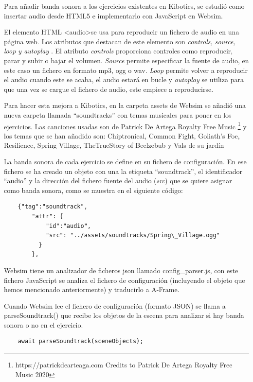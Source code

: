Para añadir banda sonora a los ejercicios existentes en Kibotics, se estudió como insertar audio desde HTML5 e implementarlo con JavaScript en Websim.

El elemento HTML \textless audio\textgreater  se usa para reproducir un fichero de audio en una página web.
Los atributos que destacan de este elemento son \textit{controls, source, loop y autoplay }.
El atributo \textit{controls} proporciona controles como reproducir, parar y subir o bajar el volumen.
 \textit{Source} permite especificar la fuente de audio, en este caso un fichero en formato mp3, ogg o wav. \textit{Loop} permite volver a reproducir el audio cuando este se acaba, el audio estará en bucle y \textit{autoplay} se utiliza para que una vez se cargue el fichero de audio, este empiece a reproducirse.

Para hacer esta mejora a Kibotics, en la carpeta assets de Websim se añadió una nueva carpeta llamada ``soundtracks'' con temas musicales para poner en los ejercicios. Las canciones usadas son de Patrick De Artega Royalty Free Music  \footnote{ https://patrickdearteaga.com Credits to Patrick De Artega Royalty Free Music 2020}
y los temas que se han añadido son:
Chiptronical, Common Fight, Goliath's Foe, Resilience, Spring Village, TheTrueStory of Beelzebub y Vals de su jardín


La banda sonora de cada ejercicio se define en su fichero de configuración. En ese fichero se ha creado un objeto con una  la etiqueta ``soundtrack'', el identificador ``audio'' y la dirección del fichero fuente del audio (\textit{src}) que se quiere asignar como banda sonora, como se muestra en el siguiente código:

\begin{lstlisting}
 	{"tag":"soundtrack",
        "attr": {
            "id":"audio",
            "src": "../assets/soundtracks/Spring\_Village.ogg"
          }
        },
   \end{lstlisting}

Websim tiene un analizador de ficheros json llamado config\_parser.js, con este fichero JavaScript se analiza el fichero de configuración (incluyendo el objeto que hemos mencionado anteriormente) y traducirlo a A-Frame.

Cuando Websim lee el fichero de configuración (formato JSON) se llama a parseSoundtrack() que recibe los objetos de la escena para analizar si hay banda sonora o no en el ejercicio.

\begin{lstlisting}
 	await parseSoundtrack(sceneObjects);
\end{lstlisting}

